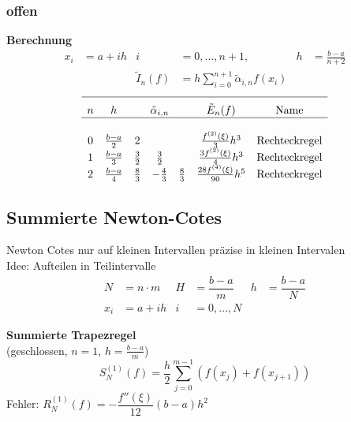 \documentclass[
	ngerman,
	accentcolor=9c,%
	type=intern,
	marginpar=false
	]{tudapub}
\begin{document}
        \subsubsection{offen}
        \textbf{Berechnung}
        \begin{align*}
            x_i &= a+ih &  i&=0,\dots,n+1, &  h&=\frac{b-a}{n+2} \\
            & & \tilde{I}_n(f) &= h \sum^{n+1}_{i=0} \tilde{\alpha}_{i,n} f(x_i)
        \end{align*}
        \begin{equation*}
            \begin{array}{c c c c c c c}
                \hline\\[-.5\normalbaselineskip]
                n & h & \multicolumn{3}{c}{\tilde{\alpha}_{i,n}}& \tilde{E}_n (f) & \text{Name}\\
                \hline\\
                0 & \frac{b-a}{2} & 2 & & & \frac{f^{(2)}(\xi)}{3}h^3 & \text{Rechteckregel}\\
                1 & \frac{b-a}{3} & \frac{3}{2} & \frac{3}{2} & & \frac{3f^{(2)}(\xi)}{4}h^3 & \text{Rechteckregel}\\
                2 & \frac{b-a}{4} & \frac{8}{3} & -\frac{4}{3} & \frac{8}{3} & \frac{28f^{(4)}(\xi)}{90}h^5 & \text{Rechteckregel}\\
            \end{array}
        \end{equation*}\newpage
    \subsection{Summierte Newton-Cotes}
    Newton Cotes nur auf kleinen Intervallen präzise in kleinen Intervalen\\
    Idee: Aufteilen in Teilintervalle
    \begin{align*}
        N &= n \cdot m & H&= \dfrac{b-a}{m} & h&= \dfrac{b-a}{N}\\
        x_i &=  a + ih & i&= 0,\dots, N
    \end{align*}

    \textbf{Summierte Trapezregel}\\
    (geschlossen, $n=1$, $h  = \frac{b-a}{m}$)
    \begin{equation*}
        S^{(1)}_N(f) = \dfrac{h}{2} \sum_{j=0}^{m-1}(f(x_j) + f(x_{j+1})) 
    \end{equation*}
    Fehler: $R^{(1)}_N(f)=-\dfrac{f''(\xi)}{12}(b-a)h^2$\\[2ex]
      
\end{document}
